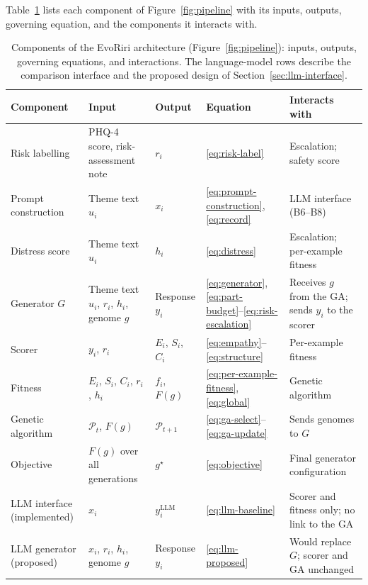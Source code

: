 \documentclass[mathematics,article,submit,xetex,moreauthors]{Definitions/mdpi}
\begin{document}
Table~\ref{tab:components} lists each component of Figure~\ref{fig:pipeline}
with its inputs, outputs, governing equation, and the components it interacts
with.

\begin{table}[H]
\centering
\footnotesize
\caption{Components of the EvoRiri architecture (Figure~\ref{fig:pipeline}):
inputs, outputs, governing equations, and interactions. The language-model
rows describe the comparison interface and the proposed design of
Section~\ref{sec:llm-interface}.}
\label{tab:components}
\renewcommand{\arraystretch}{1.15}
\begin{tabularx}{\textwidth}{
  >{\raggedright\arraybackslash}p{2.3cm}
  >{\raggedright\arraybackslash}X
  >{\raggedright\arraybackslash}p{1.7cm}
  >{\raggedright\arraybackslash}p{1.5cm}
  >{\raggedright\arraybackslash}X
}
\toprule
\textbf{Component} & \textbf{Input} & \textbf{Output} & \textbf{Equation} & \textbf{Interacts with} \\
\midrule
Risk labelling & PHQ-4 score, risk-assessment note & $r_i$ & \eqref{eq:risk-label} & Escalation; safety score \\
Prompt construction & Theme text $u_i$ & $x_i$ & \eqref{eq:prompt-construction}, \eqref{eq:record} & LLM interface (B6--B8) \\
Distress score & Theme text $u_i$ & $h_i$ & \eqref{eq:distress} & Escalation; per-example fitness \\
Generator $G$ & Theme text $u_i$, $r_i$, $h_i$, genome $g$ & Response $y_i$ & \eqref{eq:generator}, \eqref{eq:part-budget}--\eqref{eq:risk-escalation} & Receives $g$ from the GA; sends $y_i$ to the scorer \\
Scorer & $y_i$, $r_i$ & $E_i$, $S_i$, $C_i$ & \eqref{eq:empathy}--\eqref{eq:structure} & Per-example fitness \\
Fitness & $E_i$, $S_i$, $C_i$, $r_i$, $h_i$ & $f_i$, $F(g)$ & \eqref{eq:per-example-fitness}, \eqref{eq:global} & Genetic algorithm \\
Genetic algorithm & $\mathcal{P}_t$, $F(g)$ & $\mathcal{P}_{t+1}$ & \eqref{eq:ga-select}--\eqref{eq:ga-update} & Sends genomes to $G$ \\
Objective & $F(g)$ over all generations & $g^{\star}$ & \eqref{eq:objective} & Final generator configuration \\
LLM interface (implemented) & $x_i$ & $y_i^{\mathrm{LLM}}$ & \eqref{eq:llm-baseline} & Scorer and fitness only; no link to the GA \\
LLM generator (proposed) & $x_i$, $r_i$, $h_i$, genome $g$ & Response $y_i$ & \eqref{eq:llm-proposed} & Would replace $G$; scorer and GA unchanged \\
\bottomrule
\end{tabularx}
\end{table}
\end{document}
